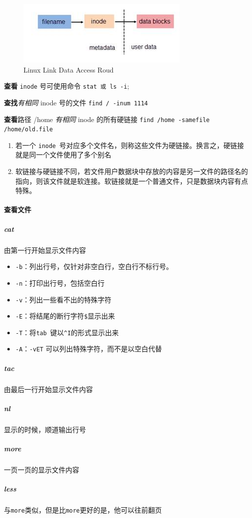 \documentclass[UTF8,a4paper,12pt]{ctexbook}
\begin{document}
			\begin{figure}
				\centering
				\includegraphics[scale = 1.2]{figure/Link.jpg}	
				\caption{Linux Link Data Access Roud}
				\label{Link}
			\end{figure}
			
			\textbf{查看} \verb|inode| 号可使用命令 \verb|stat 或 ls -i|;
			
			\textbf{查找}\textit{有相同} inode 号的文件 \verb|find / -inum 1114|
			
			\textbf{查看}路径 /home \textit{有相同} inode 的所有硬链接 \verb|find /home -samefile /home/old.file |
			
			\begin{enumerate}
				\item 若一个 \verb|inode |号对应多个文件名，则称这些文件为硬链接。换言之，硬链接就是同一个文件使用了多个别名
				
				\item 软链接与硬链接不同，若文件用户数据块中存放的内容是另一文件的路径名的指向，则该文件就是软连接。软链接就是一个普通文件，只是数据块内容有点特殊。
			\end{enumerate}
		\paragraph{查看文件}
			\subparagraph{cat} 由第一行开始显示文件内容
				\begin{itemize}[itemindent = 1em]
					\item \verb|-b|：列出行号，仅针对非空白行，空白行不标行号。
					\item \verb|-n|：打印出行号，包括空白行
					\item \verb|-v|：列出一些看不出的特殊字符
					\item \verb|-E|：将结尾的断行字符\verb|$|显示出来
					\item \verb|-T|：将\verb|tab |键以\verb|^I|的形式显示出来
					\item \verb|-A|：\verb|-vET| 可以列出特殊字符，而不是以空白代替
				\end{itemize}
			\subparagraph{tac} 由最后一行开始显示文件内容
			
			\subparagraph{nl} 显示的时候，顺道输出行号
			\subparagraph{more} 一页一页的显示文件内容
			\subparagraph{less} 与\verb|more|类似，但是比\verb|more|更好的是，他可以往前翻页
			
\end{document}
